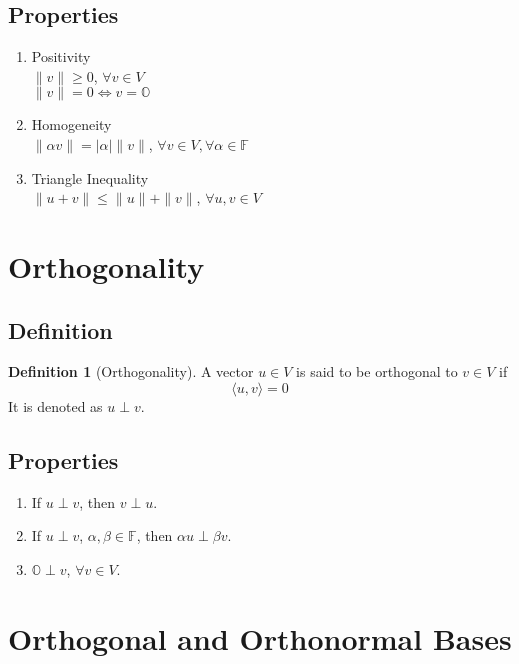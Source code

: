 \documentclass[fleqn, a4paper, 12pt]{article}
\theoremstyle{definition}
\newtheorem{definition}{Definition} %
\theoremstyle{theorem}
\theoremstyle{remark}
\numberwithin{corollary}{theorem}
\numberwithin{equation}{theorem}
\begin{document}
\subsection{Properties}

\begin{enumerate}
	\item Positivity\\
		$\| v \| \geq 0$, $\forall v \in V$\\
		$\| v \| = 0 \iff v = \mathbb{O}$
	\item Homogeneity\\
		$\| \alpha v \| = |\alpha| \| v \|$, $\forall v \in V, \forall \alpha \in \mathbb{F}$
	\item Triangle Inequality\\
		$\| u+v \| \leq \| u \| + \| v \|$, $\forall u, v \in V$
\end{enumerate}

\section{Orthogonality}

\subsection{Definition}

\begin{definition}[Orthogonality]
	A vector $u \in V$ is said to be orthogonal to $v \in V$ if
	\begin{equation*}
		\langle u, v \rangle = 0
	\end{equation*}
	It is denoted as $u \perp v$.
\end{definition}

\subsection{Properties}

\begin{enumerate}
	\item If $u \perp v$, then $v \perp u$.
	\item If $u \perp v$, $\alpha, \beta \in \mathbb{F}$, then $\alpha u \perp \beta v$.
	\item $\mathbb{O} \perp v$, $\forall v \in V$.
\end{enumerate}

\section{Orthogonal and Orthonormal Bases}
\end{document}
